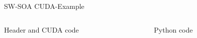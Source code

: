 %
\begin{Frame}{SW-SOA CUDA-Example}
  \begin{columns}[t]
    \begin{column}{\BW} %
      \begin{block}{Header and CUDA code}
        
      \end{block} 
    \end{column}
    
    \begin{column}{\BW} %
      \begin{block}{Python code}
        
      \end{block}   
    \end{column}
  \end{columns}
\end{Frame}


